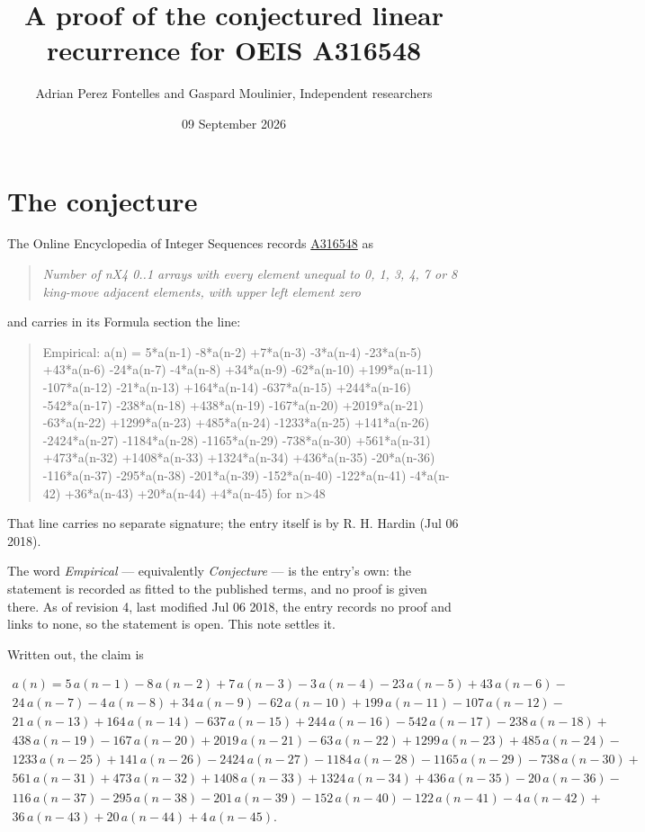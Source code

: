\documentclass[11pt]{article}
\title{A proof of the conjectured linear recurrence for OEIS A316548}
\author{Adrian Perez Fontelles and Gaspard Moulinier, Independent researchers}
\date{09 September 2026}
\theoremstyle{definition}
\begin{document}
\maketitle
\section{The conjecture}

The Online Encyclopedia of Integer Sequences records \href{https://oeis.org/A316548}{A316548} as

\begin{quote}\itshape Number of nX4 0..1 arrays with every element unequal to 0, 1, 3, 4, 7 or 8 king-move adjacent elements, with upper left element zero\end{quote}

and carries in its Formula section the line:

\begin{quote}\ttfamily Empirical: a(n) = 5*a(n-1) -8*a(n-2) +7*a(n-3) -3*a(n-4) -23*a(n-5) +43*a(n-6) -24*a(n-7) -4*a(n-8) +34*a(n-9) -62*a(n-10) +199*a(n-11) -107*a(n-12) -21*a(n-13) +164*a(n-14) -637*a(n-15) +244*a(n-16) -542*a(n-17) -238*a(n-18) +438*a(n-19) -167*a(n-20) +2019*a(n-21) -63*a(n-22) +1299*a(n-23) +485*a(n-24) -1233*a(n-25) +141*a(n-26) -2424*a(n-27) -1184*a(n-28) -1165*a(n-29) -738*a(n-30) +561*a(n-31) +473*a(n-32) +1408*a(n-33) +1324*a(n-34) +436*a(n-35) -20*a(n-36) -116*a(n-37) -295*a(n-38) -201*a(n-39) -152*a(n-40) -122*a(n-41) -4*a(n-42) +36*a(n-43) +20*a(n-44) +4*a(n-45) for n>48\end{quote}

That line carries no separate signature; the entry itself is by R. H. Hardin (Jul 06 2018).

The word {\itshape Empirical} --- equivalently {\itshape Conjecture} --- is the entry's own: the statement is recorded as fitted to the published terms, and no proof is given there. As of revision 4, last modified Jul 06 2018, the entry records no proof and links to none, so the statement is open. This note settles it.

Written out, the claim is

\begin{multline*} a(n) = 5\,a(n-1) - 8\,a(n-2) + 7\,a(n-3) - 3\,a(n-4) - 23\,a(n-5) + 43\,a(n-6) - \\ 24\,a(n-7) - 4\,a(n-8) + 34\,a(n-9) - 62\,a(n-10) + 199\,a(n-11) - 107\,a(n-12) - \\ 21\,a(n-13) + 164\,a(n-14) - 637\,a(n-15) + 244\,a(n-16) - 542\,a(n-17) - 238\,a(n-18) + \\ 438\,a(n-19) - 167\,a(n-20) + 2019\,a(n-21) - 63\,a(n-22) + 1299\,a(n-23) + 485\,a(n-24) - \\ 1233\,a(n-25) + 141\,a(n-26) - 2424\,a(n-27) - 1184\,a(n-28) - 1165\,a(n-29) - 738\,a(n-30) + \\ 561\,a(n-31) + 473\,a(n-32) + 1408\,a(n-33) + 1324\,a(n-34) + 436\,a(n-35) - 20\,a(n-36) - \\ 116\,a(n-37) - 295\,a(n-38) - 201\,a(n-39) - 152\,a(n-40) - 122\,a(n-41) - 4\,a(n-42) + \\ 36\,a(n-43) + 20\,a(n-44) + 4\,a(n-45). \end{multline*}
\end{document}
